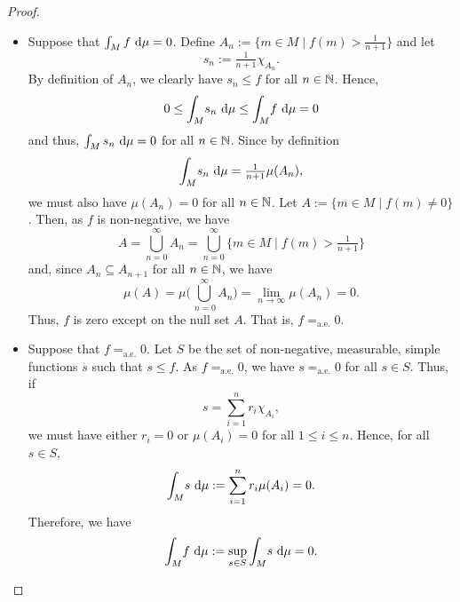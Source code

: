 \begin{proof}
\begin{itemize}
\item[$(\Rightarrow)$] Suppose that $\int_Mf\,\mathop{}\!\mathrm{d}\mu=0$. Define $A_n:=\{m\in M \mid f(m)>\tfrac{1}{n+1}\}$ and let
\begin{equation*}
s_n := \tfrac{1}{n+1}\chi_{A_n} .
\end{equation*}
By definition of $A_n$, we clearly have $s_n\leq f$ for all $n\in\mathbb{N}$. Hence,
\begin{equation*}
0\leq \int_M\!s_n\,\mathop{}\!\mathrm{d}\mu\leq\int_M\!f\,\mathop{}\!\mathrm{d}\mu=0
\end{equation*}
and thus, $\int_Ms_n\,\mathop{}\!\mathrm{d}\mu=0$ for all $n\in\mathbb{N}$. Since by definition
\begin{equation*}
\int_M\!s_n\,\mathop{}\!\mathrm{d}\mu = \tfrac{1}{n+1}\mu(A_n),
\end{equation*}
we must also have $\mu(A_n)=0$ for all $n\in\mathbb{N}$. Let $A:=\{m\in M \mid f(m)\neq 0\}$. Then, as $f$ is non-negative, we have
\begin{equation*}
A = \bigcup_{n=0}^{\infty}A_n=\bigcup_{n=0}^{\infty}\{m\in M \mid f(m)>\tfrac{1}{n+1}\}
\end{equation*}
and, since $A_n\subseteq A_{n+1}$ for all $n\in\mathbb{N}$, we have
\begin{equation*}
\mu(A)=\mu\biggl(\bigcup_{\,n=0}^{\infty}A_n\biggr)=\lim_{n\to\infty}\mu(A_n) = 0.
\end{equation*}
Thus, $f$ is zero except on the null set $A$. That is, $f=_{\mathrm{a.e.}}0$. 

\item[$(\Leftarrow)$] Suppose that $f=_{\mathrm{a.e.}}0$. Let $S$ be the set of non-negative, measurable, simple functions $s$ such that $s\leq f$. As $f=_{\mathrm{a.e.}}0$, we have $s=_{\mathrm{a.e.}}0$ for all $s\in S$. Thus, if
\begin{equation*}
s=\sum_{i=1}^nr_i\chi_{A_i},
\end{equation*}
we must have either $r_i=0$ or $\mu(A_i)=0$ for all $1\leq i\leq n$. Hence, for all $s\in S$,
\begin{equation*}
\int_M\! s \, \mathop{}\!\mathrm{d} \mu := \sum_{i=1}^nr_i\mu(A_i) =0.
\end{equation*}
Therefore, we have
\begin{equation*}
\int_M\! f \, \mathop{}\!\mathrm{d} \mu := \sup_{s\in S}\int_M\! s \, \mathop{}\!\mathrm{d} \mu  = 0.\qedhere
\end{equation*}
\end{itemize}
\end{proof}

